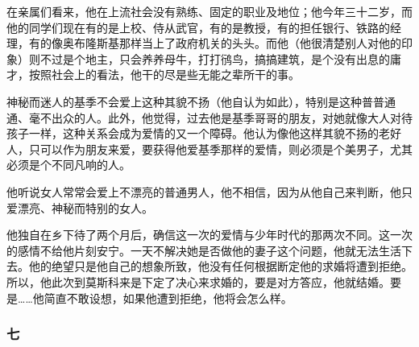 \par 在亲属们看来，他在上流社会没有熟练、固定的职业及地位；他今年三十二岁，而他的同学们现在有的是上校、侍从武官，有的是教授，有的担任银行、铁路的经理，有的像奥布隆斯基那样当上了政府机关的头头。而他（他很清楚别人对他的印象）则不过是个地主，只会养养母牛，打打鸻鸟，搞搞建筑，是个没有出息的庸才，按照社会上的看法，他干的尽是些无能之辈所干的事。
\par 神秘而迷人的基季不会爱上这种其貌不扬（他自认为如此），特别是这种普普通通、毫不出众的人。此外，他觉得，过去他是基季哥哥的朋友，对她就像大人对待孩子一样，这种关系会成为爱情的又一个障碍。他认为像他这样其貌不扬的老好人，只可以作为朋友来爱，要获得他爱基季那样的爱情，则必须是个美男子，尤其必须是个不同凡响的人。
\par 他听说女人常常会爱上不漂亮的普通男人，他不相信，因为从他自己来判断，他只爱漂亮、神秘而特别的女人。
\par 他独自在乡下待了两个月后，确信这一次的爱情与少年时代的那两次不同。这一次的感情不给他片刻安宁。一天不解决她是否做他的妻子这个问题，他就无法生活下去。他的绝望只是他自己的想象所致，他没有任何根据断定他的求婚将遭到拒绝。所以，他此次到莫斯科来是下定了决心来求婚的，要是对方答应，他就结婚。要是……他简直不敢设想，如果他遭到拒绝，他将会怎么样。


\subsubsection*{七}

